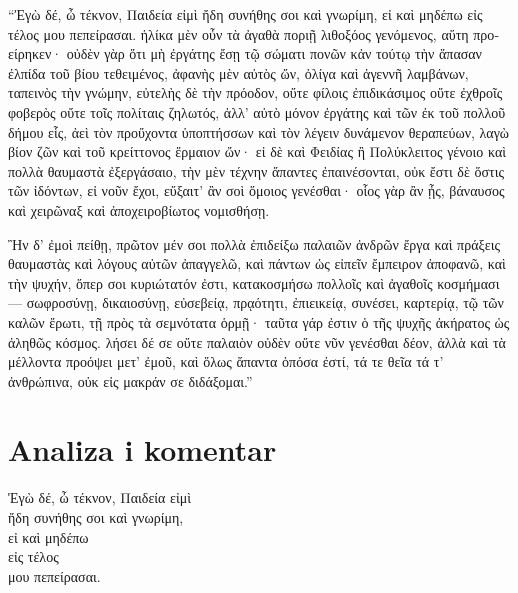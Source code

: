 {\large
{ 
\begin{greek}

\noindent ``Ἐγὼ δέ, ὦ τέκνον, Παιδεία εἰμὶ ἤδη συνήθης σοι καὶ γνωρίμη, εἰ καὶ μηδέπω εἰς τέλος μου πεπείρασαι. ἡλίκα μὲν οὖν τὰ ἀγαθὰ ποριῇ λιθοξόος γενόμενος, αὕτη προείρηκεν· οὐδὲν γὰρ ὅτι μὴ ἐργάτης ἔσῃ τῷ σώματι πονῶν κἀν τούτῳ τὴν ἅπασαν ἐλπίδα τοῦ βίου τεθειμένος, ἀφανὴς μὲν αὐτὸς ὤν, ὀλίγα καὶ ἀγεννῆ λαμβάνων, ταπεινὸς τὴν γνώμην, εὐτελὴς δὲ τὴν πρόοδον, οὔτε φίλοις ἐπιδικάσιμος οὔτε ἐχθροῖς φοβερὸς οὔτε τοῖς πολίταις ζηλωτός, ἀλλ' αὐτὸ μόνον ἐργάτης καὶ τῶν ἐκ τοῦ πολλοῦ δήμου εἷς, ἀεὶ τὸν προὔχοντα ὑποπτήσσων καὶ τὸν λέγειν δυνάμενον θεραπεύων, λαγὼ βίον ζῶν καὶ τοῦ κρείττονος ἕρμαιον ὤν· εἰ δὲ καὶ Φειδίας ἢ Πολύκλειτος γένοιο καὶ πολλὰ θαυμαστὰ ἐξεργάσαιο, τὴν μὲν τέχνην ἅπαντες ἐπαινέσονται, οὐκ ἔστι δὲ ὅστις τῶν ἰδόντων, εἰ νοῦν ἔχοι, εὔξαιτ' ἂν σοὶ ὅμοιος γενέσθαι· οἷος γὰρ ἂν ᾖς, βάναυσος καὶ χειρῶναξ καὶ ἀποχειροβίωτος νομισθήσῃ.

Ἢν δ' ἐμοὶ πείθῃ, πρῶτον μέν σοι πολλὰ ἐπιδείξω παλαιῶν ἀνδρῶν ἔργα καὶ πράξεις θαυμαστὰς καὶ λόγους αὐτῶν ἀπαγγελῶ, καὶ πάντων ὡς εἰπεῖν ἔμπειρον ἀποφανῶ, καὶ τὴν ψυχήν, ὅπερ σοι κυριώτατόν ἐστι, κατακοσμήσω πολλοῖς καὶ ἀγαθοῖς κοσμήμασι — σωφροσύνῃ, δικαιοσύνῃ, εὐσεβείᾳ, πρᾳότητι, ἐπιεικείᾳ, συνέσει, καρτερίᾳ, τῷ τῶν καλῶν ἔρωτι, τῇ πρὸς τὰ σεμνότατα ὁρμῇ· ταῦτα γάρ ἐστιν ὁ τῆς ψυχῆς ἀκήρατος ὡς ἀληθῶς κόσμος. λήσει δέ σε οὔτε παλαιὸν οὐδὲν οὔτε νῦν γενέσθαι δέον, ἀλλὰ καὶ τὰ μέλλοντα προόψει μετ' ἐμοῦ, καὶ ὅλως ἅπαντα ὁπόσα ἐστί, τά τε θεῖα τά τ' ἀνθρώπινα, οὐκ εἰς μακράν σε διδάξομαι.''


\end{greek}


}
}


\section*{Analiza i komentar}


{\large
\begin{greek}
\noindent  Ἐγὼ δέ, ὦ τέκνον, Παιδεία εἰμὶ \\
\tabto{2em} ἤδη συνήθης σοι καὶ γνωρίμη, \\
εἰ καὶ μηδέπω \\
\tabto{2em} εἰς τέλος \\
μου πεπείρασαι.\\

\end{greek}
}

